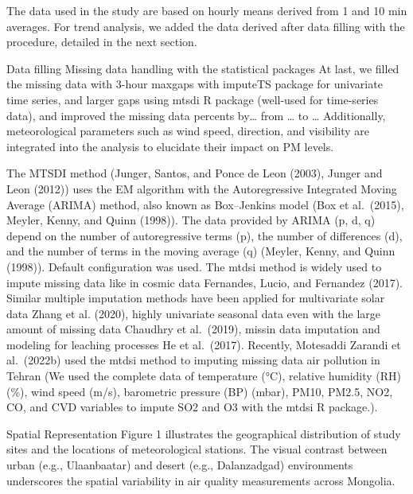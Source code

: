 \documentclass[
  11pt,
]{article}
\begin{document}
The data used in the study are based on hourly means derived from 1 and
10 min averages. For trend analysis, we added the data derived after
data filling with the procedure, detailed in the next section.

Data filling Missing data handling with the statistical packages At
last, we filled the missing data with 3-hour maxgaps with imputeTS
package for univariate time series, and larger gaps using mtsdi R
package (well-used for time-series data), and improved the missing data
percents by\ldots{} from \ldots{} to \ldots{} Additionally,
meteorological parameters such as wind speed, direction, and visibility
are integrated into the analysis to elucidate their impact on PM levels.

The MTSDI method (Junger, Santos, and Ponce de Leon (2003), Junger and
Leon (2012)) uses the EM algorithm with the Autoregressive Integrated
Moving Average (ARIMA) method, also known as Box--Jenkins model (Box et
al.~(2015), Meyler, Kenny, and Quinn (1998)). The data provided by ARIMA
(p, d, q) depend on the number of autoregressive terms (p), the number
of differences (d), and the number of terms in the moving average (q)
(Meyler, Kenny, and Quinn (1998)). Default configuration was used. The
mtdsi method is widely used to impute missing data like in cosmic data
Fernandes, Lucio, and Fernandez (2017). Similar multiple imputation
methods have been applied for multivariate solar data Zhang et al.
(2020), highly univariate seasonal data even with the large amount of
missing data Chaudhry et al.~(2019), missin data imputation and modeling
for leaching processes He et al.~(2017). Recently, Motesaddi Zarandi et
al.~(2022b) used the mtdsi method to imputing missing data air pollution
in Tehran (We used the complete data of temperature (°C), relative
humidity (RH) (\%), wind speed (m/s), barometric pressure (BP) (mbar),
PM10, PM2.5, NO2, CO, and CVD variables to impute SO2 and O3 with the
mtdsi R package.).

Spatial Representation Figure 1 illustrates the geographical
distribution of study sites and the locations of meteorological
stations. The visual contrast between urban (e.g., Ulaanbaatar) and
desert (e.g., Dalanzadgad) environments underscores the spatial
variability in air quality measurements across Mongolia.

\newpage
\end{document}
